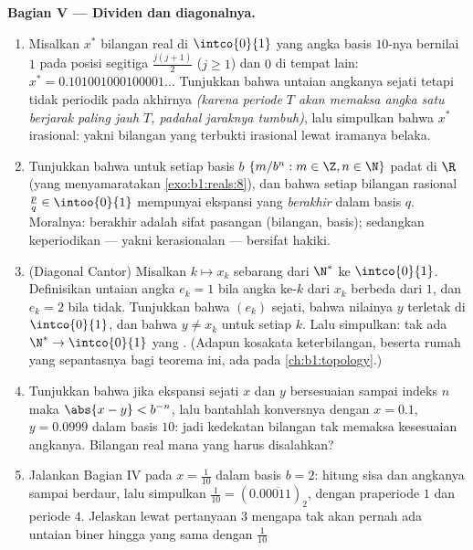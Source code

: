 \begin{problem}
\medskip
\noindent\textbf{Bagian V --- Dividen dan diagonalnya.}
\begin{enumerate}[resume]
  \item Misalkan $x^*$ bilangan real di $\intco{0}{1}$ yang angka
        basis $10$-nya bernilai $1$ pada posisi segitiga $\frac{j(j +
        1)}{2}$ ($j \geq 1$) dan $0$ di tempat lain: $x^* =
        0.101001000100001\dots$ Tunjukkan bahwa untaian angkanya
        sejati tetapi tidak periodik pada akhirnya \emph{(karena periode $T$
        akan memaksa angka satu berjarak paling jauh $T$, padahal jaraknya tumbuh)},
        lalu simpulkan bahwa $x^*$ irasional: yakni bilangan yang terbukti
        irasional lewat iramanya belaka.
  \item Tunjukkan bahwa untuk setiap basis $b$  $\{m/b^n : m \in \Z,
        n \in \N\}$ padat di $\R$ (yang menyamaratakan
        \cref{exo:b1:reals:8}), dan bahwa setiap bilangan rasional $\frac pq
        \in \intoo{0}{1}$ mempunyai ekspansi yang \emph{berakhir} dalam
        basis $q$. Moralnya: berakhir adalah sifat pasangan
        (bilangan, basis); sedangkan keperiodikan --- yakni kerasionalan --- bersifat
        hakiki.
  \item (Diagonal Cantor) Misalkan $k \mapsto x_k$ sebarang  dari
        $\N^*$ ke $\intco{0}{1}$. Definisikan untaian angka $e_k =
        1$ bila angka ke-$k$ dari $x_k$ berbeda dari $1$, dan
        $e_k = 2$ bila tidak. Tunjukkan bahwa $(e_k)$ sejati, bahwa
        nilainya $y$ terletak di $\intco{0}{1}$, dan bahwa $y \neq
        x_k$ untuk setiap $k$. Lalu simpulkan: tak ada  $\N^* \to
        \intco{0}{1}$ yang . (Adapun kosakata
        keterbilangan, beserta rumah yang sepantasnya bagi teorema ini, ada pada
        \cref{ch:b1:topology}.)
  \item Tunjukkan bahwa jika ekspansi sejati $x$ dan $y$ bersesuaian
        sampai indeks $n$ maka $\abs{x - y} < b^{-n}$, lalu bantahlah
        konversnya dengan $x = 0.1$, $y = 0.0999$ dalam basis $10$:
        jadi kedekatan bilangan tak memaksa kesesuaian angkanya.
        Bilangan real mana yang harus disalahkan?
  \item Jalankan Bagian IV pada $x = \frac{1}{10}$ dalam basis $b = 2$:
        hitung sisa dan angkanya sampai berdaur, lalu
        simpulkan $\frac{1}{10} = (0.0\overline{0011})_2$, dengan
        praperiode $1$ dan periode $4$. Jelaskan lewat pertanyaan 3 mengapa
        tak akan pernah ada untaian biner hingga yang sama dengan $\frac{1}{10}$

\end{enumerate}
\end{problem}
